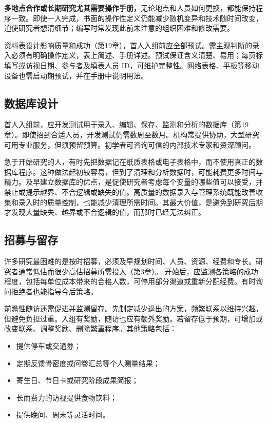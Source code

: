 \textbf{多地点合作或长期研究尤其需要操作手册，}无论地点和人员如何更换，都能保持程序一致。即使一人完成，书面的操作性定义仍能减少随机变异和技术随时间改变，迫使研究者想清细节；编写时常发现此前未注意的组织困难和修改需要。

资料表设计影响质量和成功（第19章），首人入组前应全部预试。需主观判断的录入必须有明确操作定义，表上简述、手册详述。预试保证含义清楚、易用；每页标填写或访视日期、参与者及填表人员 ID，可维护完整性。网络表格、平板等移动设备也需启动期预试，并在手册中说明用法。
\subsection{数据库设计}
首人入组前，应开发测试用于录入、编辑、保存、监测和分析的数据库（第19章）。即使招到合适人员，开发测试仍需数周至数月。机构常提供协助，大型研究可用专业服务，但须预留预算。初学者可咨询可信的内部技术专家和资深顾问。

急于开始研究的人，有时先把数据记在纸质表格或电子表格中，而不使用真正的数据库程序。这种做法起初较容易，但到了清理和分析数据时，可能耗费更多时间与精力。及早建立数据库的优点，是促使研究者考虑每个变量的哪些值可以接受，并禁止或提示越界、不合逻辑或缺失的值。高质量的数据录入与管理系统既能改善收集和录入时的质量控制，也能减少清理所需时间。其最大价值，是避免到研究后期才发现大量缺失、越界或不合逻辑的值，而那时已经无法纠正。

\subsection{招募与留存}
许多研究最困难的是按时招募，必须及早规划时间、人员、资源、经费和专长。研究者通常低估而很少高估招募所需投入（第3章）。
开始后，应监测各策略的成功程度，包括每单位成本带来的合格人数，可停用部分渠道或重新分配经费。有时询问拒绝者也能指导今后策略。

前瞻性随访还需促进并监测留存。先制定减少退出的方案，频繁联系以维持兴趣，但避免负担过重。入组有奖励，随访也应有额外奖励。若留存低于预期，可增加或改变联系、调整奖励、删除繁重程序。其他策略包括：
\begin{itemize}
\item 提供停车或交通券；
\item 定期反馈骨密度或问卷汇总等个人测量结果；
\item 寄生日、节日卡或研究阶段成果简报；
\item 长而费力的访视提供食物饮料；
\item 提供晚间、周末等灵活时间。
\end{itemize}

